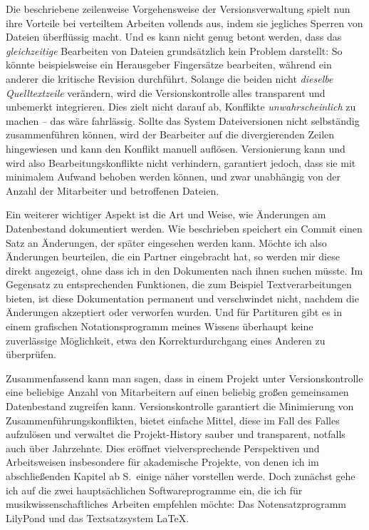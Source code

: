 \documentclass[DIV=12]{scrreprt}
\begin{document}
Die beschriebene zeilenweise Vorgehensweise der Versionsverwaltung spielt nun ihre Vorteile bei verteiltem Arbeiten vollends aus, indem sie jegliches Sperren von Dateien überflüssig macht.
Und es kann nicht genug betont werden, dass das \emph{gleichzeitige} Bearbeiten von Dateien grundsätzlich kein Problem darstellt:
So könnte beispielsweise ein Herausgeber Fingersätze bearbeiten, während ein anderer die kritische Revision durchführt.
Solange die beiden nicht \emph{dieselbe Quelltextzeile} verändern, wird die Versionskontrolle alles transparent und unbemerkt integrieren.
Dies zielt nicht darauf ab, Konflikte \emph{unwahrscheinlich} zu machen -- das wäre fahrlässig.
Sollte das System Dateiversionen nicht selbständig zusammenführen können, wird der Bearbeiter auf die divergierenden Zeilen hingewiesen und kann den Konflikt manuell auflösen.
Versionierung kann und wird also Bearbeitungskonflikte nicht verhindern, garantiert jedoch, dass sie mit minimalem Aufwand behoben werden können, und zwar unabhängig von der Anzahl der Mitarbeiter und betroffenen Dateien.

\medskip
Ein weiterer wichtiger Aspekt ist die Art und Weise, wie Änderungen am Datenbestand dokumentiert werden.
Wie beschrieben speichert ein Commit einen Satz an Änderungen, der später eingesehen werden kann.
Möchte ich also Änderungen beurteilen, die ein Partner eingebracht hat, so werden mir diese direkt angezeigt, ohne dass ich in den Dokumenten nach ihnen suchen müsste.
Im Gegensatz zu entsprechenden Funktionen, die zum Beispiel Textverarbeitungen bieten, ist diese Dokumentation permanent und verschwindet nicht, nachdem die Änderungen akzeptiert oder verworfen wurden.
Und für Partituren gibt es in einem grafischen Notationsprogramm meines Wissens überhaupt keine zuverlässige Möglichkeit, etwa den Korrekturdurchgang eines Anderen zu überprüfen.


\medskip
Zusammenfassend kann man sagen, dass in einem Projekt unter Versionskontrolle eine beliebige Anzahl von Mitarbeitern auf einen beliebig großen gemeinsamen Datenbestand zugreifen kann.
Versionskontrolle garantiert die Minimierung von Zusammenführungskonflikten, bietet einfache Mittel, diese im Fall des Falles aufzulösen und verwaltet die Projekt-History sauber und transparent, notfalls auch über Jahrzehnte.
Dies eröffnet vielversprechende Perspektiven und Arbeitsweisen insbesondere für akademische Projekte, von denen ich im abschließenden Kapitel ab S.\,\pageref{chap:pt_applications} einige näher vorstellen werde.
Doch zunächst gehe ich auf die zwei hauptsächlichen Softwareprogramme ein, die ich für musikwissenschaftliches Arbeiten empfehlen möchte:
Das Notensatzprogramm LilyPond und
das Textsatzsystem \LaTeX.
\end{document}
